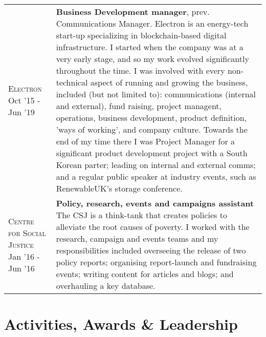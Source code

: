 \documentclass[a4paper,10pt]{article} %
\begin{document}
{\begin{tabular}{ L{4cm} L{14cm} }
	
	\textsc{Electron} \newline Oct '15 - Jun '19  & \textbf{Business Development manager}, prev. Communications Manager. \newline
	Electron is an energy-tech start-up specializing in blockchain-based digital infrastructure.\newline
	I started when the company was at a very early stage, and so my work evolved significantly throughout the time. 
	I was involved with every non-technical aspect of running and growing the business, included (but not limited to): communications (internal and external), fund raising, project managent, operations, business development, product definition, 'ways of working', and company culture.\newline 
	Towards the end of my time there I was Project Manager for a significant product development project with a South Korean parter; leading on internal and external comms; and a regular public speaker at industry events, such as RenewableUK's storage conference. \newline \\
	
	\textsc{Centre for Social Justice} \newline Jan '16 - Jun '16 & \textbf{Policy, research, events and campaigns assistant} \newline
	The CSJ is a think-tank that creates policies to alleviate the root causes of poverty. I worked with the research, campaign and events teams and my responsibilities included overseeing the release of two policy reports; organising report-launch and fundraising events; writing content for articles and blogs; and overhauling a key database. 
	
\end{tabular}



\section{Activities, Awards \& Leadership}


}
\end{document}

